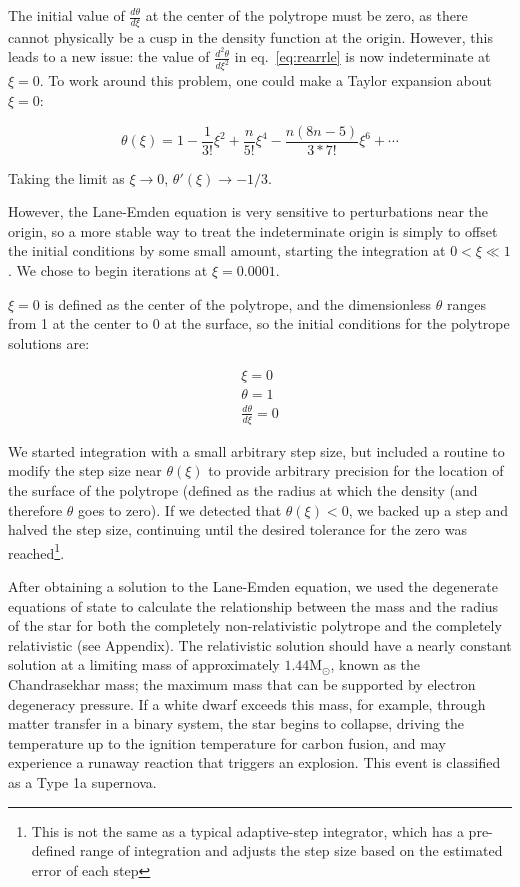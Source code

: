 \documentclass[twoside]{article}
\begin{document}
\begin{multicols}{2}
The initial value of \(\frac{d\theta}{d\xi}\) at the center of the polytrope
must be zero, as there cannot physically be a cusp in the density function at
the origin. However, this leads to a new issue: the value of
\(\frac{d^2\theta}{d\xi^2}\) in eq.~\ref{eq:rearrle} is now indeterminate at
\(\xi=0\). To work around this problem, one could make a Taylor expansion about
\(\xi=0\)\cite[p.339]{hansen2004}:

\begin{equation}
    \theta(\xi)=1-\frac{1}{3!}\xi^2+\frac{n}{5!}\xi^4-\frac{n(8n-5)}{3*7!}\xi^6+\dotsb
\end{equation}

Taking the limit as \(\xi\rightarrow 0\), \(\theta'(\xi)\rightarrow -1/3\).

However, the Lane-Emden equation is very sensitive to perturbations near the
origin\cite[p.340]{hansen2004}, so a more stable way to treat the indeterminate
origin is simply to offset the initial conditions by some small amount, starting
the integration at \(0 < \xi \ll 1\). We chose to begin iterations at
\(\xi=0.0001\).

\(\xi=0\) is defined as the center of the polytrope, and the dimensionless
\(\theta\) ranges from 1 at the center to 0 at the surface, so the initial
conditions for the polytrope solutions are:

\[
    \begin{array}{l}
        \xi = 0 \\
        \theta = 1 \\
        \frac{d\theta}{d\xi} = 0
    \end{array}
\]

We started integration with a small arbitrary step size, but included a routine
to modify the step size near \(\theta(\xi)\) to provide arbitrary precision for
the location of the surface of the polytrope (defined as the radius at which the
density (and therefore \(\theta\) goes to zero). If we detected that
\(\theta(\xi) < 0\), we backed up a step and halved the step size, continuing
until the desired tolerance for the zero was reached\footnote{This is not the
same as a typical adaptive-step integrator, which has a pre-defined range of
integration and adjusts the step size based on the estimated error of each
step}.

After obtaining a solution to the Lane-Emden equation, we used the degenerate
equations of state to calculate the relationship between the mass and the
radius of the star for both the completely non-relativistic polytrope and the
completely relativistic (see Appendix). The relativistic solution should have a
nearly constant solution at a limiting mass of approximately
\(1.44\mathrm{M}_{\odot}\), known as the Chandrasekhar mass\cite{chandra1939}; the maximum mass
that can be supported by electron degeneracy pressure. If a white dwarf exceeds
this mass, for example, through matter transfer in a binary system, the star
begins to collapse, driving the temperature up to the ignition temperature for
carbon fusion, and may experience a runaway reaction that triggers an explosion.
This event is classified as a Type 1a supernova.


\end{multicols}
\end{document}
